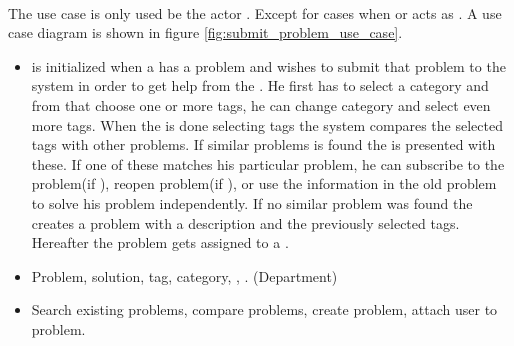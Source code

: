 \paragraph{\ucsproblem[c]} The use case \ucsproblem[] is only used be the actor \aclient. Except for cases when \astaff{} or \sadmin{}  acts as \aclient{}. A use case diagram is shown in figure \ref{fig:submit_problem_use_case}. 
\begin{itemize}
\item {} \ucsproblem[c] is initialized when a \aclient{} has a problem and wishes to submit that problem to the system in order to get help from the \astaff{}. 
He first has to select a category and from that choose one or more tags, he can change category and select even more tags. 
When the \aclient{} is done selecting tags the system compares the selected tags with other problems. 
If similar problems is found the \aclient{} is presented with these.
If one of these matches his particular problem, he can subscribe to the problem(if \open), reopen problem(if \closed{}), or use the information in the old problem to solve his problem independently. 
If no similar problem was found the \aclient{} creates a problem with a description and the previously selected tags. 
Hereafter the problem gets assigned to a \astaff{}. 

\item {} Problem, solution, tag, category, \client, \staff. (Department)

\item {} Search existing problems, compare problems, create problem, attach user to problem.
\end{itemize}


